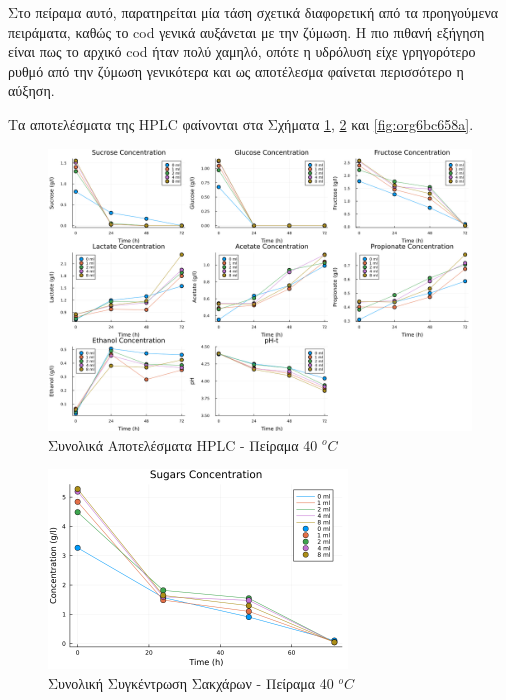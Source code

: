\documentclass[11pt]{report}
\begin{document}
\begin{enumerate}
Στο πείραμα αυτό, παρατηρείται μία τάση σχετικά διαφορετική από τα προηγούμενα πειράματα, καθώς το \acrshort{cod} γενικά αυξάνεται με την ζύμωση. Η πιο πιθανή εξήγηση είναι πως το αρχικό \acrshort{cod} ήταν πολύ χαμηλό, οπότε η υδρόλυση είχε γρηγορότερο ρυθμό από την ζύμωση γενικότερα και ως αποτέλεσμα φαίνεται περισσότερο η αύξηση.

Τα αποτελέσματα της HPLC φαίνονται στα Σχήματα \ref{fig:org9770f86}, \ref{fig:org4d2fad5} και \ref{fig:org6bc658a}.

\begin{figure}[htbp]
\centering
\includegraphics[width=.9\linewidth]{../plots/28_11/final_scatter_28_11.png}
\caption{\label{fig:org9770f86}Συνολικά Αποτελέσματα HPLC - Πείραμα 40 \(^oC\)}
\end{figure}

\begin{figure}[htbp]
\centering
\includegraphics[width=300px]{../plots/28_11/sugars_conc_scatter_28_11.png}
\caption{\label{fig:org4d2fad5}Συνολική Συγκέντρωση Σακχάρων - Πείραμα 40 \(^oC\)}
\end{figure}


\end{enumerate}
\end{document}
